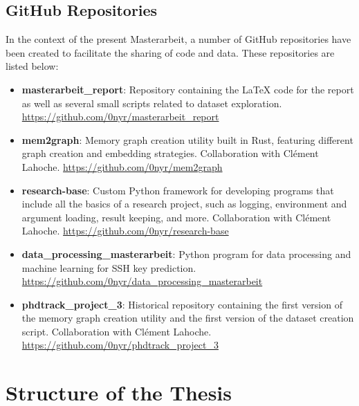 	\subsection{GitHub Repositories}

	In the context of the present Masterarbeit, a number of GitHub repositories have been created to facilitate the sharing of code and data. These repositories are listed below:

	\begin{itemize}
		\item \textbf{masterarbeit\_report}: Repository containing the LaTeX code for the report as well as several small scripts related to dataset exploration. \url{https://github.com/0nyr/masterarbeit_report}
		\item \textbf{mem2graph}: Memory graph creation utility built in Rust, featuring different graph creation and embedding strategies. Collaboration with Clément Lahoche. \url{https://github.com/0nyr/mem2graph}
		\item \textbf{research-base}: Custom Python framework for developing programs that include all the basics of a research project, such as logging, environment and argument loading, result keeping, and more. Collaboration with Clément Lahoche. \url{https://github.com/0nyr/research-base}
		\item \textbf{data\_processing\_masterarbeit}: Python program for data processing and machine learning for SSH key prediction. \url{https://github.com/0nyr/data_processing_masterarbeit}
		\item \textbf{phdtrack\_project\_3}: Historical repository containing the first version of the memory graph creation utility and the first version of the dataset creation script. Collaboration with Clément Lahoche. \url{https://github.com/0nyr/phdtrack_project_3}
	\end{itemize}

\section{Structure of the Thesis}











